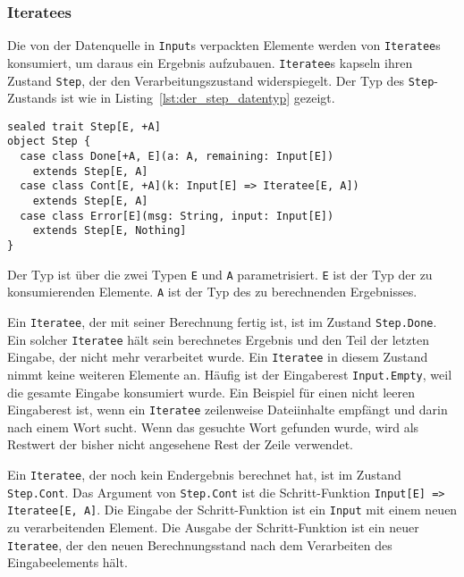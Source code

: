 \documentclass[draft=false
              ,paper=a4
              ,twoside=false
              ,fontsize=11pt
              ,headsepline
              ,BCOR10mm
              ,DIV11
              ]{scrbook}
\begin{document}


\subsubsection{Iteratees} %
\label{ssub:design_iteratees}

Die von der Datenquelle in \lstinline|Input|s verpackten Elemente werden von \lstinline|Iteratee|s konsumiert, um daraus ein Ergebnis aufzubauen.
\lstinline|Iteratee|s kapseln ihren Zustand \lstinline|Step|, der den Verarbeitungszustand widerspiegelt.
Der Typ des \lstinline|Step|-Zustands ist wie in Listing~\ref{lst:der_step_datentyp} gezeigt.
\begin{lstlisting}[caption=Der Step-Datentyp, label=lst:der_step_datentyp]
sealed trait Step[E, +A]
object Step {
  case class Done[+A, E](a: A, remaining: Input[E])
    extends Step[E, A]
  case class Cont[E, +A](k: Input[E] => Iteratee[E, A])
    extends Step[E, A]
  case class Error[E](msg: String, input: Input[E])
    extends Step[E, Nothing]
}
\end{lstlisting}

Der Typ ist über die zwei Typen \lstinline|E| und \lstinline|A| parametrisiert.
\lstinline|E| ist der Typ der zu konsumierenden Elemente.
\lstinline|A| ist der Typ des zu berechnenden Ergebnisses.

Ein \lstinline|Iteratee|, der mit seiner Berechnung fertig ist, ist im Zustand \lstinline|Step.Done|.
Ein solcher \lstinline|Iteratee| hält sein berechnetes Ergebnis und den Teil der letzten Eingabe, der nicht mehr verarbeitet wurde.
Ein \lstinline|Iteratee| in diesem Zustand nimmt keine weiteren Elemente an.
Häufig ist der Eingaberest \lstinline|Input.Empty|, weil die gesamte Eingabe konsumiert wurde.
Ein Beispiel für einen nicht leeren Eingaberest ist, wenn ein \lstinline|Iteratee| zeilenweise Dateiinhalte empfängt und darin nach einem Wort sucht.
Wenn das gesuchte Wort gefunden wurde, wird als Restwert der bisher nicht angesehene Rest der Zeile verwendet.

Ein \lstinline|Iteratee|, der noch kein Endergebnis berechnet hat, ist im Zustand \lstinline|Step.Cont|.
Das Argument von \lstinline|Step.Cont| ist die Schritt-Funktion \lstinline[breaklines=true]|Input[E] => Iteratee[E, A]|.
Die Eingabe der Schritt-Funktion ist ein \lstinline|Input| mit einem neuen zu verarbeitenden Element.
Die Ausgabe der Schritt-Funktion ist ein neuer \lstinline|Iteratee|, der den neuen Berechnungsstand nach dem Verarbeiten des Eingabeelements hält.
\end{document}
